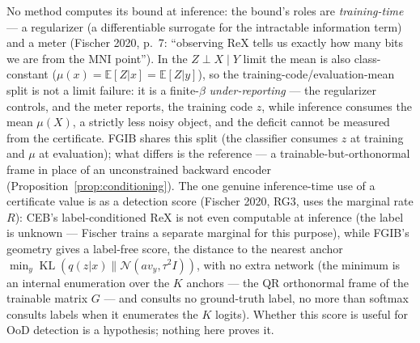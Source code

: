 \begin{remark}\label{rem:training-role}
No method computes its bound at inference: the bound's roles are \emph{training-time}
--- a regularizer (a differentiable surrogate for the intractable information term) and
a meter (Fischer 2020, p.~7: ``observing ReX tells us exactly how many bits we are from
the MNI point''). In the $Z \perp X \mid Y$ limit the mean is also class-constant
($\mu(x) = \mathbb{E}[Z|x] = \mathbb{E}[Z|y]$), so the training-code/evaluation-mean
split is not a limit failure: it is a finite-$\beta$
\emph{under-reporting} --- the regularizer controls, and the meter reports, the training
code $z$, while inference consumes the mean $\mu(X)$, a strictly less noisy object, and
the deficit cannot be measured from the certificate. FGIB shares this split (the
classifier consumes $z$ at training and $\mu$ at evaluation); what differs is the
reference --- a trainable-but-orthonormal frame in place of an unconstrained backward
encoder (Proposition~\ref{prop:conditioning}).
The one genuine inference-time use of a certificate value is as a detection score
(Fischer 2020, RG3, uses the marginal rate $R$): CEB's label-conditioned
$\mathrm{ReX}$ is not even computable at inference (the label is unknown --- Fischer
trains a separate marginal for this purpose), while FGIB's geometry gives a label-free
score, the distance to the nearest anchor
$\min_y \operatorname{KL}(q(z|x)\|\mathcal{N}(a v_y, \tau^2 I))$, with no extra network
(the minimum is an internal enumeration over the $K$ anchors --- the QR orthonormal
frame of the trainable matrix $G$ --- and consults no ground-truth label, no more than
softmax consults labels when it enumerates the $K$ logits). Whether this score is useful
for OoD detection is a hypothesis; nothing here proves it.
\end{remark}

